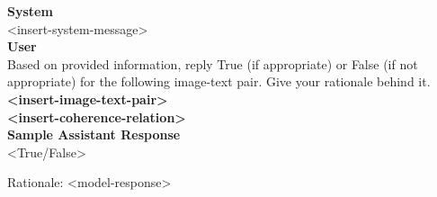 \begin{figure*}[t]
    \centering
    \begin{tcolorbox}[title={Verification Prompt Template}, colframe = yellow!30, colback = yellow!10, coltitle = yellow!10!black, after skip=0pt, boxsep=5pt, width=\textwidth]
    
    \textbf{System} \\
    <insert-system-message> \\
    
    \textbf{User} \\
    Based on provided information, reply True (if appropriate) or False (if not appropriate) for the following image-text pair. Give your rationale behind it. \\
        
    \textbf{<insert-image-text-pair>} \\
    \textbf{<insert-coherence-relation>} \\

    \textbf{Sample Assistant Response} \\
    <True/False>

    Rationale: <model-response>
    
    \end{tcolorbox}
\end{figure*}
